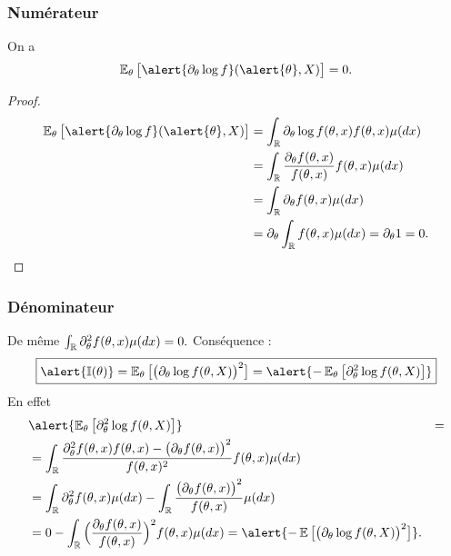 \begin{frame}
\frametitle{Numérateur}
\begin{lem}
On a $$\E_\truetheta\big[\alert{\partial_\truetheta \log f}(\alert{\truetheta}, X)\big]=0.$$
\end{lem}
\begin{proof}
\begin{align*}
\E_\truetheta\big[\alert{\partial_\truetheta \log f}(\alert{\truetheta}, X)\big] & = \int_{\R} \partial_\truetheta \log f(\truetheta, x) f(\truetheta, x)\mu(dx) \\
& = \int_{\R} \frac{\partial_\truetheta f(\truetheta, x)}{f(\truetheta, x)} f(\truetheta, x) \mu(dx) \\
& = \int_{\R} \partial_\truetheta f(\truetheta, x) \mu(dx) \\
& = \partial_\truetheta \int_{\R} f(\truetheta, x) \mu(dx) = \partial_\truetheta 1 = 0.
\end{align*}
\end{proof}
\end{frame}

\begin{frame}
\frametitle{Dénominateur}
De même $\int_{\operatorname{{\mathbb R}}} \partial_\theta^2 f(\theta, x) \mu(dx)= 0.$
\alert{Conséquence} :
 $$\boxed{\alert{\mathbb{I}(\truetheta)} = \E_\truetheta\big[\big(\partial_\truetheta \log f(\truetheta, X)\big)^2\big] = \alert{-\E_\truetheta\big[\partial_\truetheta^2 \log f(\truetheta, X)\big]}}$$
En effet
\begin{align*}
&\alert{ \E_\truetheta\big[\partial_\truetheta^2 \log f(\truetheta, X)\big]} & =
\\
& = \int_{\R} \frac{\partial_\truetheta^2 f(\truetheta,x) f(\truetheta, x)-\big(\partial_\truetheta f(\truetheta, x)\big)^2}{f(\truetheta, x)^2}f(\truetheta, x)\mu(dx)\\
&= \int_{\R}\partial_\truetheta^2 f(\truetheta, x)\mu(dx)-\int_{\R} \frac{\big(\partial_\truetheta f(\truetheta, x)\big)^2}{f(\truetheta, x)}\mu(dx) \\
& = 0-\int_{\R} \Big(\frac{\partial_\truetheta f(\truetheta,x)}{f(\truetheta, x)}\Big)^2f(\truetheta, x) \mu(dx) =\alert{ -\E\big[\big(\partial_\truetheta\log f(\truetheta, X)\big)^2\big]}.
\end{align*}
\end{frame}




